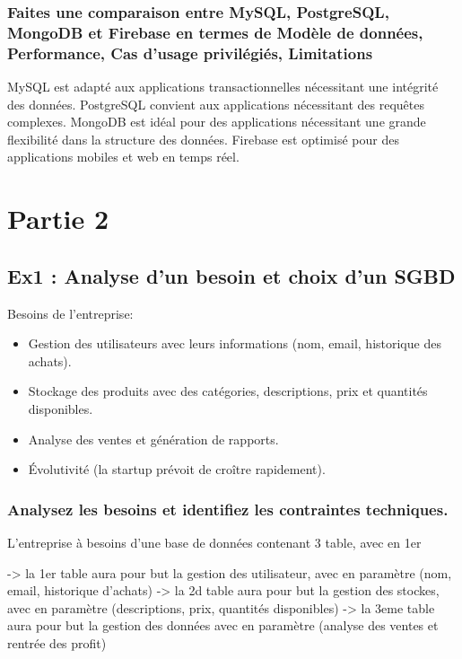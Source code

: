 \documentclass{article}
\begin{document}
\subsubsection{Faites une comparaison entre MySQL, PostgreSQL, MongoDB et Firebase en termes de Modèle de données, Performance, Cas d’usage privilégiés, Limitations}
MySQL est adapté aux applications transactionnelles nécessitant une intégrité des données. 
PostgreSQL convient aux applications nécessitant des requêtes complexes.  
MongoDB est idéal pour des applications nécessitant une grande flexibilité dans la structure des 
données. 
Firebase est optimisé pour des applications mobiles et web en temps réel. 

\section{Partie 2}


\subsection{Ex1 : Analyse d’un besoin et choix d’un SGBD}

Besoins de l'entreprise: 
    \begin{itemize}
      \item Gestion des utilisateurs avec leurs informations (nom, email, historique des achats).
      \item Stockage des produits avec des catégories, descriptions, prix et quantités disponibles.
      \item Analyse des ventes et génération de rapports.
      \item Évolutivité (la startup prévoit de croître rapidement).
    \end{itemize}

\subsubsection{Analysez les besoins et identifiez les contraintes techniques.}
L'entreprise à besoins d'une base de données contenant 3 table, avec en 1er 

-> la 1er table aura pour but la gestion des utilisateur, avec en paramètre (nom, email, historique d'achats)
-> la 2d table aura pour but la gestion des stockes, avec en paramètre (descriptions, prix, quantités disponibles)
-> la 3eme table aura pour but la gestion des données avec en paramètre (analyse des ventes et rentrée des profit)
\end{document}
